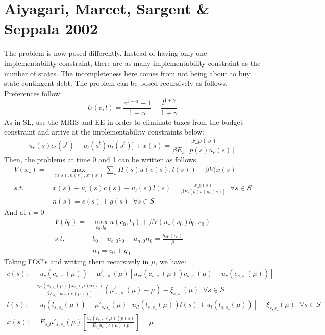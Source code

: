 \documentclass{article} %
\begin{document}
\section{Aiyagari, Marcet, Sargent \& Seppala 2002}
The problem is now posed differently. Instead of having only one implementability constraint, there are as many implementability constraint as the number of states. The incompleteness here comes from not being about to buy state contingent debt. The problem can be posed recursively as follows. Preferences follow:
\begin{equation}
  U(c,l) = \frac{c^{1-\alpha} - 1}{1-\alpha} - \frac{l^{1+\gamma}}{1+\gamma} \label{eqn2:preferences}
\end{equation}
As in SL, use the MRIS and EE in order to eliminate taxes from the budget constraint and arrive at the implementability constraints below:
\begin{equation}
u_c(s)c_t(s^t) - u_l(s^t)n_t(s^t)]  + x(s) = \frac{x\_ p(s)}{\beta E_s[p(s)u_c(s)]} \label{eqn2:ic}
\end{equation}
Then, the problems at time 0 and 1 can be written as follows
\begin{align}
V(x\_) = & \max_{c(s),n(s),x'(s')} \sum_{s} \Pi(s) u(c(s),l(s)) + \beta V(x(s)  \nonumber \\
  s.t.\;    & x(s) + u_c(s)c(s) - u_l(s)l(s) = \frac{x\_ p(s)}{\beta E_s[p(s)u_c(s)]} \;\; \forall s \in S    \label{amss_IC} \\
  & n(s) = c(s) + g(s) \;\; \forall s \in S \label{amss_feasibility}
\end{align}
And at $t=0$
\begin{align}
V(b_0) = & \max_{c_0,l_0}  u(c_0,l_0) + \beta  V(u_c(s_0)b_0,s_0) \nonumber \\
  s.t.\;    & b_0 + u_{c,0}c_0  - u_{n,0}n_0 = \frac{b_0p(s_0)}{\beta} \nonumber \\
  & n_0 = c_0 + g_0 \nonumber
\end{align}
Taking FOC's and writing them recursively in $\mu$, we have:
\begin{align}
  c(s): & \;\; u_c(c_{s,s\_}(\mu)) - \mu'_{s,s\_}(\mu)[u_{cc}(c_{s,s\_}(\mu))c_{s,s\_}(\mu) + u_c(c_{s,s\_}(\mu))] - \nonumber \\ & \frac{u_{cc}(c_{s,s\_}(\mu))x_{s\_}(\mu) p(s)}{\beta E_{s\_}[p u_c(c(\mu))]}(\mu'_{s,s\_}(\mu) - \mu) - \xi_{s,s\_}(\mu) \;\; \forall s \in S    \label{amss_foc_c} \\
   l(s): & \;\; u_l(l_{s,s\_}(\mu)) - \mu'_{s,s\_}(\mu)[u_{ll}(l_{s,s\_}(\mu))l(s) + u_l(l_{s,s\_}(\mu))] +  \xi_{s,s\_}(\mu) \;\; \forall s \in S    \label{amss_foc_l} \\
   x(s): & \;\; E_{s\_}\mu'_{s,s\_}(\mu)\left[\frac{u_c(c_{s,s\_}(\mu))p(s)}{E_{s\_}u_c(c(\mu))p}\right] =  \mu\_     \label{amss_foc_x}
\end{align}
\end{document}
